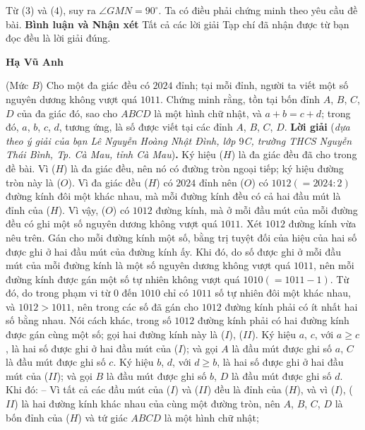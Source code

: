 \begin{multicols}{2}
	Từ ($3$) và ($4$), suy ra  $\angle GMN = 90^\circ$.
	\vskip 0.05cm
	Ta có điều phải chứng minh theo yêu cầu đề bài.
	\vskip 0.05cm
	\textbf{Bình luận và Nhận xét}
	\vskip 0.05cm
	Tất cả các lời giải Tạp chí đã nhận được từ bạn đọc đều là lời giải đúng.
	\begin{flushright}
		\textbf{Hạ Vũ Anh}
	\end{flushright}
	{}
	(Mức $B$) Cho một đa giác đều có $2024$ đỉnh; tại mỗi đỉnh, người ta viết một số nguyên dương không vượt quá $1011$. Chứng minh rằng, tồn tại bốn đỉnh $A$, $B$, $C$, $D$ của đa giác đó, sao cho $ABCD$ là một hình chữ nhật, và $a + b = c + d$; trong đó, $a$, $b$, $c$, $d$, tương ứng, là số được viết tại các đỉnh $A$, $B$, $C$, $D$.
	\vskip 0.05cm
	\textbf{Lời giải} (\textit{dựa theo ý giải của bạn Lê Nguyễn Hoàng Nhật Đình, lớp $9$C, trường THCS Nguyễn Thái Bình, Tp. Cà Mau, tỉnh Cà Mau})\textbf{.}
	\vskip 0.05cm
	Ký hiệu ($H$) là đa giác đều đã cho trong đề bài.
	\vskip 0.05cm
	Vì ($H$) là đa giác đều, nên nó có đường tròn ngoại tiếp; ký hiệu đường tròn này là ($O$).
	\vskip 0.05cm
	Vì đa giác đều ($H$) có $2024$ đỉnh nên ($O$) có $1012 (= 2024 : 2)$ đường kính đôi một khác nhau, mà mỗi đường kính đều có cả hai đầu mút là đỉnh của ($H$). Vì vậy, ($O$) có $1012$ đường kính, mà ở mỗi đầu mút của mỗi đường đều có ghi một số nguyên dương không vượt quá $1011$.
	\vskip 0.05cm
	Xét $1012$ đường kính vừa nêu trên.
	\vskip 0.05cm
	Gán cho mỗi đường kính một số, bằng trị tuyệt đối của hiệu của hai số được ghi ở hai đầu mút của đường kính ấy.
	\vskip 0.05cm
	Khi đó, do số được ghi ở mỗi đầu mút của mỗi đường kính là một số nguyên dương không vượt quá $1011$, nên mỗi đường kính được gán một số tự nhiên không vượt quá $1010 (= 1011 - 1)$.
	\vskip 0.05cm
	Từ đó, do trong phạm vi từ $0$ đến $1010$ chỉ có $1011$ số tự nhiên đôi một khác nhau, và $1012 > 1011$, nên trong các số đã gán cho $1012$ đường kính phải có ít nhất hai số bằng nhau. Nói cách khác, trong số $1012$ đường kính phải có hai đường kính được gán cùng một số; gọi hai đường kính này là ($I$), ($II$).
	\vskip 0.05cm
	Ký hiệu $a$, $c$, với $a \ge c$, là hai số được ghi ở hai đầu mút của ($I$); và gọi $A$ là đầu mút được ghi số $a$, $C$ là đầu mút được ghi số $c$.
	\vskip 0.05cm
	Ký hiệu $b$, $d$, với $d \ge b$, là hai số được ghi ở hai đầu mút của ($II$); và gọi $B$ là đầu mút được ghi số $b$, $D$ là đầu mút được ghi số $d$.
	\vskip 0.05cm
	Khi đó:
	\vskip 0.05cm
	-- Vì tất cả các đầu mút của ($I$) và ($II$) đều là đỉnh của ($H$), và vì ($I$), ($II$) là hai đường kính khác nhau của cùng một đường tròn, nên $A$, $B$, $C$, $D$ là bốn đỉnh của ($H$) và tứ giác $ABCD$ là một hình chữ nhật;

\end{multicols}
